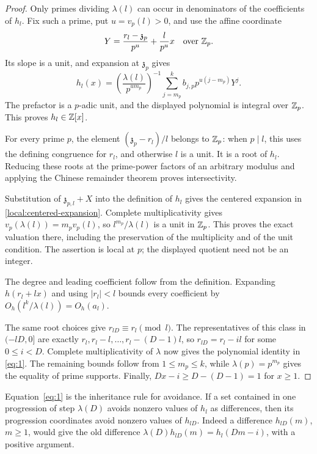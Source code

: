 \begin{proof}
Only primes dividing \(\lambda(l)\) can occur in denominators of the
coefficients of \(h_l\). Fix such a prime, put \(u=v_p(l)>0\), and use the
affine coordinate
\[
 Y=\frac{r_l-\mathfrak z_p}{p^u}+\frac{l}{p^u}x
 \quad\text{over }\mathbb Z_p.
\]
Its slope is a unit, and expansion at \(\mathfrak z_p\) gives
\begin{equation}\label{local:normalized-expansion}
 h_l(x)=
 \left(\frac{\lambda(l)}{p^{u m_p}}\right)^{-1}
 \sum_{j=m_p}^k b_{j,p}p^{u(j-m_p)}Y^j.
\end{equation}
The prefactor is a \(p\)-adic unit, and the displayed polynomial is integral
over \(\mathbb Z_p\). This proves \(h_l\in\mathbb Z[x]\).

For every prime \(p\), the element
\((\mathfrak z_p-r_l)/l\) belongs to \(\mathbb Z_p\): when \(p\mid l\), this
uses the defining congruence for \(r_l\), and otherwise \(l\) is a unit.
It is a root of \(h_l\). Reducing these roots at the prime-power factors of
an arbitrary modulus and applying the Chinese remainder theorem proves
intersectivity.

Substitution of \(\mathfrak z_{p,l}+X\) into the definition of \(h_l\)
gives the centered expansion in \eqref{local:centered-expansion}. Complete
multiplicativity gives \(v_p(\lambda(l))=m_pv_p(l)\), so
\(l^{m_p}/\lambda(l)\) is a unit in \(\mathbb Z_p\). This proves the exact valuation
there, including the preservation of the multiplicity and of the unit
condition. The assertion is local at \(p\); the displayed quotient need not
be an integer.

The degree and leading coefficient follow from the definition. Expanding
\(h(r_l+lx)\) and using \(|r_l|<l\) bounds every coefficient by
\(O_h(l^k/\lambda(l))=O_h(a_l)\).

The same root choices give \(r_{lD}\equiv r_l\pmod l\). The representatives
of this class in \((-lD,0]\) are exactly
\(r_l,r_l-l,\ldots,r_l-(D-1)l\), so \(r_{lD}=r_l-il\) for some
\(0\le i<D\). Complete multiplicativity of \(\lambda\) now gives the
polynomial identity in \eqref{eq:1}. The remaining bounds follow from
\(1\le m_p\le k\), while \(\lambda(p)=p^{m_p}\) gives the equality of prime
supports. Finally, \(Dx-i\ge D-(D-1)=1\) for \(x\ge1\).
\end{proof}

Equation~\eqref{eq:1} is the inheritance rule for avoidance. If a set
contained in one progression of step \(\lambda(D)\) avoids nonzero values
of \(h_l\) as differences, then its progression coordinates avoid nonzero
values of \(h_{lD}\). Indeed a difference \(h_{lD}(m)\), \(m\ge1\), would
give the old difference
\(\lambda(D)h_{lD}(m)=h_l(Dm-i)\), with a positive argument.

